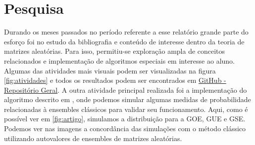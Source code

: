 \documentclass[12pt]{report}
\begin{document}
\section{Pesquisa}
 
 Durando os meses passados no período referente a esse relatório grande parte do esforço foi no estudo da bibliografia e conteúdo de interesse dentro da teoria de matrizes aleatórias. Para isso, permitiu-se exploração ampla de conceitos relacionados e implementação de algoritmos especiais em interesse ao aluno. Algumas das atividades mais visuais podem ser visualizadas na figura \ref{fig:atividades} e todos os resultados podem ser encontrados em \href{https://github.com/Joao-vap/RMT-Code/tree/main}{GitHub - Repositório Geral}. A outra atividade principal realizada foi a implementação do algoritmo descrito em \cite{Chafa__2018}, onde podemos simular algumas medidas de probabilidade relacionadas à ensembles clássicos para validar seu funcionamento. Aqui, como é possível ver em \ref{fig:artigo}, simulamos a distribuição para a GOE, GUE e GSE. Podemos ver nas imagens a concordância das simulações com o método clássico utilizando autovalores de ensembles de matrizes aleatórias.
\end{document}
